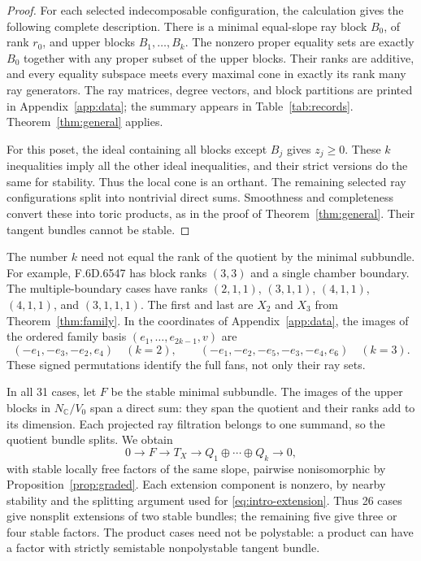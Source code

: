\documentclass[11pt]{amsart}
\theoremstyle{definition}
\theoremstyle{remark}
\newcommand{\CC}{\mathbb C}
\begin{document}
\begin{proof}
For each selected indecomposable configuration, the calculation gives
the following complete description. There is a minimal equal-slope
ray block $B_0$, of rank $r_0$, and upper blocks $B_1,\ldots,B_k$.
The nonzero proper equality sets are exactly $B_0$ together with any
proper subset of the upper blocks. Their ranks are additive, and
every equality subspace meets every maximal cone in exactly its rank
many ray generators. The ray matrices, degree vectors, and block
partitions are printed in Appendix~\ref{app:data}; the summary appears
in Table~\ref{tab:records}. Theorem~\ref{thm:general} applies.

For this poset, the ideal containing all blocks except $B_j$ gives
$z_j\ge0$. These $k$ inequalities imply all the other ideal
inequalities, and their strict versions do the same for stability.
Thus the local cone is an orthant. The remaining selected ray
configurations split into nontrivial direct sums. Smoothness and
completeness convert these into toric products, as in the proof of
Theorem~\ref{thm:general}. Their tangent bundles cannot be stable.
\end{proof}

The number $k$ need not equal the rank of the quotient by the minimal
subbundle. For example, F.6D.6547 has block ranks $(3,3)$ and a
single chamber boundary. The multiple-boundary cases have ranks
$(2,1,1)$, $(3,1,1)$, $(4,1,1)$, $(4,1,1)$, and $(3,1,1,1)$.
The first and last are $X_2$ and $X_3$ from Theorem~\ref{thm:family}.
In the coordinates of Appendix~\ref{app:data}, the images of the ordered
family basis $(e_1,\ldots,e_{2k-1},v)$ are
\[
 (-e_1,-e_3,-e_2,e_4)\quad(k=2),\qquad
 (-e_1,-e_2,-e_5,-e_3,-e_4,e_6)\quad(k=3).
\]
These signed permutations identify the full fans, not only their ray sets.

In all 31 cases, let $F$ be the stable minimal subbundle. The images
of the upper blocks in $N_\CC/V_0$ span a direct sum: they span the
quotient and their ranks add to its dimension. Each projected ray
filtration belongs to one summand, so the quotient bundle splits.
We obtain
\begin{equation}\label{eq:census-extension}
 0\longrightarrow F\longrightarrow T_X
 \longrightarrow Q_1\oplus\cdots\oplus Q_k\longrightarrow0,
\end{equation}
with stable locally free factors of the same slope, pairwise
nonisomorphic by Proposition~\ref{prop:graded}. Each extension
component is nonzero, by nearby stability and the splitting argument
used for \eqref{eq:intro-extension}. Thus 26 cases give nonsplit
extensions of two stable bundles; the remaining five give three or
four stable factors. The product cases need not be polystable:
a product can have a factor with strictly semistable nonpolystable
tangent bundle.
\end{document}
